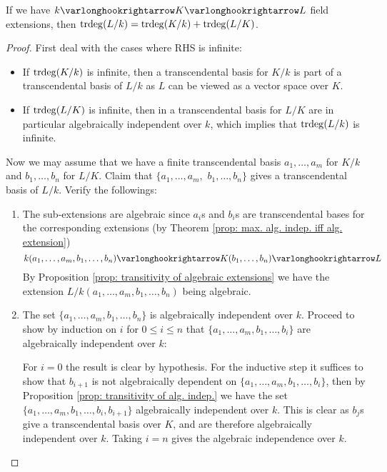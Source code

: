 \documentclass{article}
\begin{document}
\begin{proposition}\label{prop: trdeg is additive}
    If we have $k \ext K \ext L$ field extensions, then $\operatorname{trdeg}(L/k) = \operatorname{trdeg}(K/k) + \operatorname{trdeg}(L/K)$.
\end{proposition}

\begin{proof}
    First deal with the cases where RHS is infinite:
    \begin{itemize}[label=$-$]
        \item If $\operatorname{trdeg}(K/k)$ is infinite, then a transcendental basis for $K/k$ is part of a transcendental basis of $L/k$ as $L$ can be viewed as a vector space over $K$. 
        \item If $\operatorname{trdeg}(L/K)$ is infinite, then in a transcendental basis for $L/K$ are in particular algebraically independent over $k$, which implies that $\operatorname{trdeg}(L/k)$ is infinite.
    \end{itemize}
    Now we may assume that we have a finite transcendental basis $a_1, \dots, a_m$ for $K/k$ and $b_1, \dots, b_n$ for $L/K$. Claim that $\{a_1, \dots, a_m, $ $b_1, \dots, b_n\}$ gives a transcendental basis of $L/k$. Verify the followings:
    \begin{enumerate}[label=\arabic*)]
        \item The sub-extensions are algebraic since $a_i$s and $b_i$s are transcendental bases for the corresponding extensions (by Theorem \ref{prop: max. alg. indep. iff alg. extension})
        \[
            k(a_1, \dots, a_m, b_1, \dots, b_n) \ext K(b_1, \dots, b_n) \ext L
        \]
        By Proposition \ref{prop: transitivity of algebraic extensions} we have the extension $L/k(a_1, \dots, a_m, b_1, \dots, b_n)$ being algebraic. 
        \item The set $\{a_1, \dots, a_m, b_1, \dots, b_n\}$ is algebraically independent over $k$. Proceed to show by induction on $i$ for $0 \leq i \leq n$ that $\{a_1, \dots, a_m, b_1, \dots, b_i\}$ are algebraically independent over $k$:
        
        For $i = 0$ the result is clear by hypothesis. For the inductive step it suffices to show that $b_{i+1}$ is not algebraically dependent on $\{a_1, \dots, a_m, b_1, \dots, b_i\}$, then by Proposition \ref{prop: transitivity of alg. indep.} we have the set $\{a_1, \dots, a_m, b_1, \dots, b_i, b_{i+1}\}$ algebraically independent over $k$. This is clear as $b_j$s give a transcendental basis over $K$, and are therefore algebraically independent over $k$. Taking $i = n$ gives the algebraic independence over $k$. 
    \end{enumerate}
\end{proof}
\end{document}
